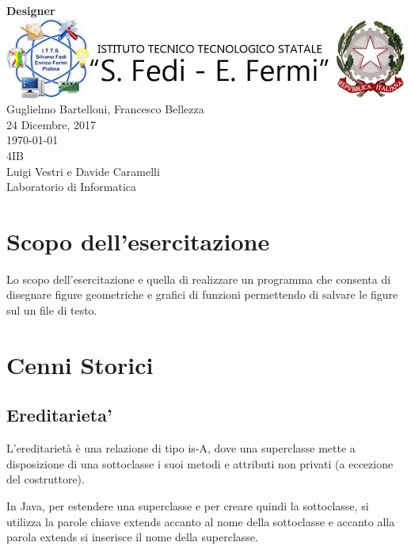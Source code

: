\documentclass[a4paper,12pt,times,numbered,print,index]{article}
\author{Guglielmo Bartelloni}
\begin{document}
%
%
\begin{titlepage}
\begin{center}
	\vspace{1cm}
	\textbf{\huge{Designer}}\\ 
	\vspace{1cm}
	\includegraphics[scale=0.7]{logoITTS.jpg}\\
	\vspace{1cm}
	\large{Guglielmo Bartelloni, Francesco Bellezza}\\
	\vspace{0.5cm}
	24 Dicembre, 2017\\
	\today\\
	\vspace{0.5cm}
	\vspace{0.5cm}
	4IB\\
	Luigi Vestri e Davide Caramelli\\
	\vspace{1cm}
	\Large{Laboratorio di Informatica}
\end{center}
\end{titlepage}
\vspace*{1cm}
\tableofcontents
\clearpage
%
%
\section{Scopo dell'esercitazione}
Lo scopo dell'esercitazione e quella di realizzare un programma che consenta di disegnare figure geometriche e grafici di funzioni permettendo di salvare le figure sul un file di testo.

\section{Cenni Storici}


\subsection{Ereditarieta'}
L’ereditarietà è una relazione di tipo is-A, dove una superclasse mette a disposizione di una sottoclasse i suoi metodi e attributi non privati (a eccezione del costruttore).

In Java, per estendere una superclasse e per creare quindi la sottoclasse, si utilizza la parole chiave extends accanto al nome della sottoclasse e accanto alla parola extends si inserisce il nome della superclasse.
\end{document}
